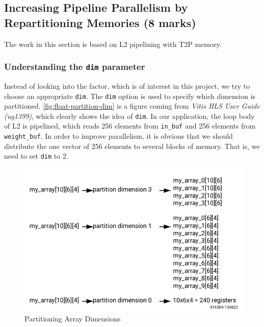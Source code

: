 \subsection{Increasing Pipeline Parallelism by Repartitioning Memories (8 marks)}

The work in this section is based on L2 pipelining with T2P memory.

\subsubsection{Understanding the \texttt{dim} parameter}\label{sec:1cDim}

Instead of looking into the factor, which is of interest in this project,
we try to choose an appropriate \texttt{dim}.
The \texttt{dim} option is used to specify which dimension is partitioned.
\autoref{fig:float-partition-dim} is a figure coming from \textit{Vitis HLS User Guide (ug1399)}, which clearly shows the idea of \texttt{dim}.
In our application, the loop body of L2 is pipelined, which reads 256 elements from \texttt{in\_buf} and 256 elements from \texttt{weight\_buf}.
In order to improve parallelism, it is obvious that we should distribute the one vector of 256 elements to several blocks of memory.
That is, we need to set \texttt{dim} to 2.

\begin{figure}[ht!]
    \centering
    \includegraphics[scale=0.5]{images/float-partition-dim.png}
    \caption{Partitioning Array Dimensions}
    \label{fig:float-partition-dim}
\end{figure}

